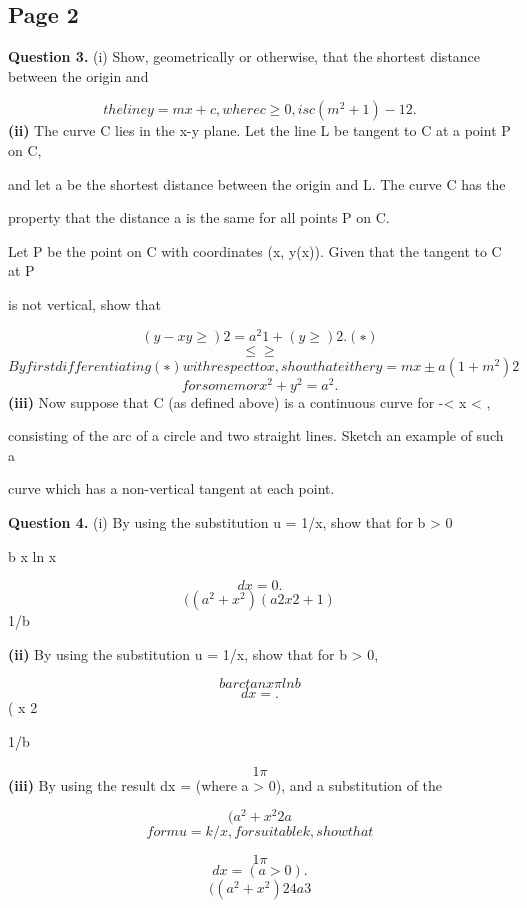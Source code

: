 \documentclass[12pt]{article}
\begin{document}
\subsection*{Page 2}
\begin{flushleft}
\bigskip\textbf{Question 3.} (i) Show, geometrically or otherwise, that the shortest distance between the origin and\par
\[the line y = mx + c, where c \geq 0, is c(m^2 + 1) - 1 2 .\]
\textbf{(ii)} The curve C lies in the x-y plane. Let the line L be tangent to C at a point P on C,\par
and let a be the shortest distance between the origin and L. The curve C has the\par
property that the distance a is the same for all points P on C.\par
Let P be the point on C with coordinates (x, y(x)). Given that the tangent to C at P\par
is not vertical, show that\par
\[(y - xy \geq )2 = a^2 1 + (y \geq )2 . (∗)\]
\[\leq \geq\]
\[By first differentiating (∗) with respect to x, show that either y = mx ± a(1 + m^2) 2\]
\[for some m or x^2 + y^2 = a^2.\]
\textbf{(iii)} Now suppose that C (as defined above) is a continuous curve for -\infty < x < \infty,\par
consisting of the arc of a circle and two straight lines. Sketch an example of such a\par
curve which has a non-vertical tangent at each point.\par
\bigskip\textbf{Question 4.} (i) By using the substitution u = 1/x, show that for b > 0\par
b x ln x\par
\[dx = 0 .\]
\[( (a^2 + x^2)(a2x2 + 1)\]
1/b\par
\textbf{(ii)} By using the substitution u = 1/x, show that for b > 0,\par
\[b arctan x \pi ln b\]
\[dx = .\]
( x 2\par
1/b\par
\infty\par
\[1 \pi\]
\textbf{(iii)} By using the result dx = (where a > 0), and a substitution of the\par
\[( a^2 + x^2 2a\]
\[form u = k/x, for suitable k, show that\]
\infty\par
\[1 \pi\]
\[dx = (a > 0).\]
\[( (a^2 + x^2)2 4a3\]
\end{flushleft}
\end{document}
